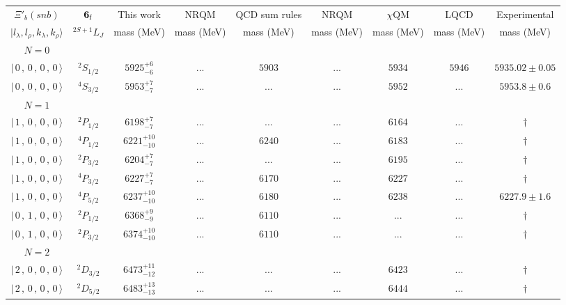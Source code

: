 \begin{tabular}{c c| c c c c c c c}\hline \hline
$\Xi'_{b}(snb)$& ${\bf {6}}_{\rm f}$& This work   &   NRQM \cite{Yoshida2015}     &  QCD sum rules \cite{Liu2008, Mao2015, Chen2016}      &  NRQM \cite{Roberts2008}    & $\chi$QM \cite{Kim2021}        & LQCD \cite{Mohanta2020}     & Experimental  \\ 
 $\vert l_{\lambda}, l_{\rho}, k_{\lambda}, k_{\rho} \rangle$ & $^{2S+1}L_{J}$ & mass (MeV)  &   mass (MeV)  &  mass (MeV)  &  mass (MeV) & mass (MeV) & mass (MeV) &      mass (MeV) \\ \hline
\hline
 $N=0$  &  &  &  &  &  \\ 
$\vert \,0\,,\,0\,,\,0\,,\,0 \,\rangle $ & $^{2}S_{1/2}$ & $5925^{+6}_{-6}$ & ... & $5903$ & ... & $5934$ & $5946$ & $5935.02\pm 0.05$ \\ 
$\vert \,0\,,\,0\,,\,0\,,\,0 \,\rangle $ & $^{4}S_{3/2}$ & $5953^{+7}_{-7}$ & ... & ... & ... & $5952$ & ... & $5953.8\pm 0.6$ \\ 
\hline
 $N=1$  &  &  &  &  &  \\ 
$\vert \,1\,,\,0\,,\,0\,,\,0 \,\rangle $ & $^{2}P_{1/2}$ & $6198^{+7}_{-7}$ & ... & ... & ... & $6164$ & ... & $\dagger$ \\ 
$\vert \,1\,,\,0\,,\,0\,,\,0 \,\rangle $ & $^{4}P_{1/2}$ & $6221^{+10}_{-10}$ & ... & $6240$ & ... & $6183$ & ... & $\dagger$ \\ 
$\vert \,1\,,\,0\,,\,0\,,\,0 \,\rangle $ & $^{2}P_{3/2}$ & $6204^{+7}_{-7}$ & ... & ... & ... & $6195$ & ... & $\dagger$ \\ 
$\vert \,1\,,\,0\,,\,0\,,\,0 \,\rangle $ & $^{4}P_{3/2}$ & $6227^{+7}_{-7}$ & ... & $6170$ & ... & $6227$ & ... & $\dagger$ \\ 
$\vert \,1\,,\,0\,,\,0\,,\,0 \,\rangle $ & $^{4}P_{5/2}$ & $6237^{+10}_{-10}$ & ... & $6180$ & ... & $6238$ & ... & $6227.9\pm 1.6$ \\ 
$\vert \,0\,,\,1\,,\,0\,,\,0 \,\rangle $ & $^{2}P_{1/2}$ & $6368^{+9}_{-9}$ & ... & $6110$ & ... & ... & ... & $\dagger$ \\ 
$\vert \,0\,,\,1\,,\,0\,,\,0 \,\rangle $ & $^{2}P_{3/2}$ & $6374^{+10}_{-10}$ & ... & $6110$ & ... & ... & ... & $\dagger$ \\ 
\hline
 $N=2$  &  &  &  &  &  \\ 
$\vert \,2\,,\,0\,,\,0\,,\,0 \,\rangle $ & $^{2}D_{3/2}$ & $6473^{+11}_{-12}$ & ... & ... & ... & $6423$ & ... & $\dagger$ \\ 
$\vert \,2\,,\,0\,,\,0\,,\,0 \,\rangle $ & $^{2}D_{5/2}$ & $6483^{+13}_{-13}$ & ... & ... & ... & $6444$ & ... & $\dagger$ \\ 

\end{tabular}

